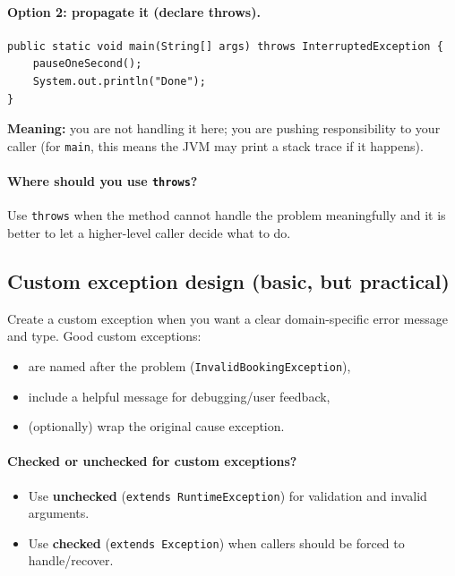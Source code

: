 \documentclass[11pt]{article}
\begin{document}
\paragraph{Option 2: propagate it (declare throws).}
\begin{lstlisting}
public static void main(String[] args) throws InterruptedException {
    pauseOneSecond();
    System.out.println("Done");
}
\end{lstlisting}
\textbf{Meaning:} you are not handling it here; you are pushing responsibility to your caller (for \texttt{main}, this means the JVM may print a stack trace if it happens).

\paragraph{Where should you use \texttt{throws}?}
Use \texttt{throws} when the method cannot handle the problem meaningfully and it is better to let a higher-level caller decide what to do.

\subsection{Custom exception design (basic, but practical)}
Create a custom exception when you want a clear domain-specific error message and type.
Good custom exceptions:
\begin{itemize}
  \item are named after the problem (\texttt{InvalidBookingException}),
  \item include a helpful message for debugging/user feedback,
  \item (optionally) wrap the original cause exception.
\end{itemize}

\paragraph{Checked or unchecked for custom exceptions?}
\begin{itemize}
  \item Use \textbf{unchecked} (\texttt{extends RuntimeException}) for validation and invalid arguments.
  \item Use \textbf{checked} (\texttt{extends Exception}) when callers should be forced to handle/recover.
\end{itemize}
\notesources{\OOPSUnitIIISources}
\end{document}
